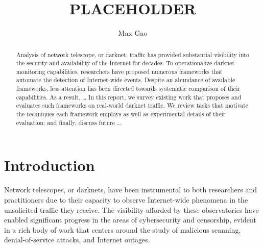 \documentclass[manuscript,nonacm]{acmart}
\begin{document}
\title{PLACEHOLDER}
\author{Max Gao}

\begin{abstract}
Analysis of network telescope, or darknet, traffic has provided substantial visibility into the security and availability of the Internet for decades.
To operationalize darknet monitoring capabilities, researchers have proposed numerous frameworks that automate the detection of Internet-wide events.
Despite an abundance of available frameworks, less attention has been directed towards systematic comparison of their capabilities. 
As a result, \dots
In this report, we survey existing work that proposes and evaluates such frameworks on real-world darknet traffic.
We review tasks that motivate the techniques each framework employs as well as experimental details of their evaluation; and finally, discuss future \dots
\end{abstract}

\maketitle

\section{Introduction}

Network telescopes, or darknets, have been instrumental to both researchers and practitioners due to their capacity to observe Internet-wide phenomena in the unsolicited traffic they receive. 
The visibility afforded by these observatories have enabled significant progress in the areas of cybersecurity and censorship, evident in a rich body of work that centers around the study of malicious scanning, denial-of-service attacks, and Internet outages. 
\end{document}

